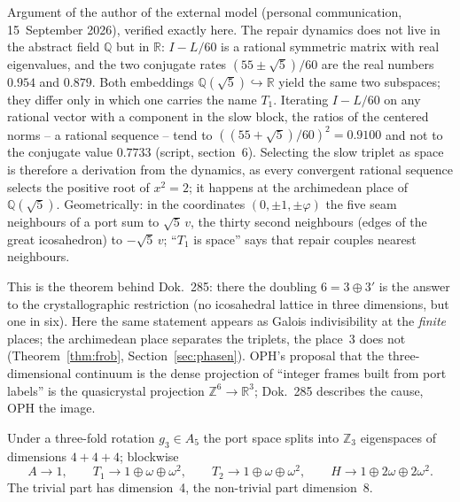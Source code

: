 \begin{remark}\label{rem:arch}
Argument of the author of the external model (personal communication,
15~September 2026), verified exactly here.
The repair dynamics does not live in the abstract field $\mathbb{Q}$ but in
$\mathbb{R}$: $I-L/60$ is a rational symmetric matrix with real
eigenvalues, and the two conjugate rates $(55\pm\sqrt5)/60$ are the real
numbers $0.954$ and $0.879$. Both embeddings
$\mathbb{Q}(\sqrt5)\hookrightarrow\mathbb{R}$ yield the same two subspaces;
they differ only in which one carries the name $T_1$. Iterating $I-L/60$ on
any rational vector with a component in the slow block, the ratios of the
centered norms -- a rational sequence -- tend to
$((55+\sqrt5)/60)^2=0.9100$ and not to the conjugate value $0.7733$
(script, section~6). Selecting the slow triplet as space is therefore a
derivation from the dynamics, as every convergent rational sequence
selects the positive root of $x^2=2$; it happens at the archimedean place
of $\mathbb{Q}(\sqrt5)$. Geometrically: in the coordinates
$(0,\pm1,\pm\varphi)$ the five seam neighbours of a port sum to
$\sqrt5\,v$, the thirty second neighbours (edges of the great icosahedron)
to $-\sqrt5\,v$; \enquote{$T_1$ is space} says that repair couples nearest
neighbours.
\end{remark}

This is the theorem behind Dok.~285: there the doubling $6=3\oplus3'$ is
the answer to the crystallographic restriction (no icosahedral lattice in
three dimensions, but one in six). Here the same statement appears as
Galois indivisibility at the \emph{finite} places; the archimedean place
separates the triplets, the place~3 does not (Theorem~\ref{thm:frob},
Section~\ref{sec:phasen}). OPH's proposal that the three-dimensional continuum
is the dense projection of \enquote{integer frames built from port labels}
is the quasicrystal projection $\mathbb{Z}^6\to\mathbb{R}^3$; Dok.~285
describes the cause, OPH the image.

\begin{theorem}[Restriction to $C_3<A_5$, \EM/\BM]\label{thm:c3}
Under a three-fold rotation $g_3\in A_5$ the port space splits into
$\mathbb{Z}_3$ eigenspaces of dimensions $4+4+4$; blockwise
\[
  A\to 1,\qquad T_1\to 1\oplus\omega\oplus\omega^2,\qquad
  T_2\to 1\oplus\omega\oplus\omega^2,\qquad H\to 1\oplus2\omega\oplus2\omega^2 .
\]
The trivial part has dimension~4, the non-trivial part dimension~8.
\end{theorem}

